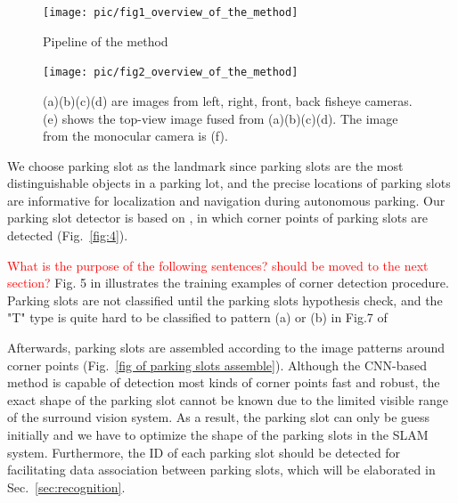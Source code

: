 \documentclass[journal]{IEEEtran}
\newcommand{\Reffig}[1]{Fig.~\ref{#1}}
\newcommand{\Refsec}[1]{Sec.~\ref{#1}}
\newcommand{\COMMENT}[1]{\textcolor{red}{#1}}
\begin{document}
\begin{figure}[htbp]
\centering
\texttt{[image: pic/fig1\_overview\_of\_the\_method]}
\caption{Pipeline of the method}\label{fig:1}
\end{figure}

\begin{figure}
\centering
\texttt{[image: pic/fig2\_overview\_of\_the\_method]}
\caption{
(a)(b)(c)(d) are images from left, right, front, back fisheye cameras. 
(e) shows the top-view image fused from (a)(b)(c)(d). The image from the monocular camera is (f). 
}\label{fig:2}
\end{figure}

%

We choose parking slot as the landmark since parking slots are the most distinguishable objects in a parking lot, and the precise locations of parking slots are informative for localization and navigation during autonomous parking.
Our parking slot detector is based on \citep{Li2017Vision}, in which corner points of parking slots are detected (\Reffig{fig:4}).

\COMMENT{What is the purpose of the following sentences? should be moved to the next section?}
Fig. 5 in \citep{Li2017Vision} illustrates the training examples of corner detection procedure.
Parking slots are not classified until the parking slots hypothesis check, and the "T" type is quite hard to be classified to pattern (a) or (b) in Fig.7 of \citep{Li2017Vision}

Afterwards, parking slots are assembled according to the image patterns around corner points (\Reffig{fig of parking slots assemble}).
Although the CNN-based method is capable of detection most kinds of corner points fast and robust, the exact shape of the parking slot cannot be known due to the limited visible range of the surround vision system.
As a result, the parking slot can only be guess initially and we have to optimize the shape of the parking slots in the SLAM system.
Furthermore, the ID of each parking slot should be detected for facilitating data association between parking slots, which will be elaborated in \Refsec{sec:recognition}.

%
\end{document}
